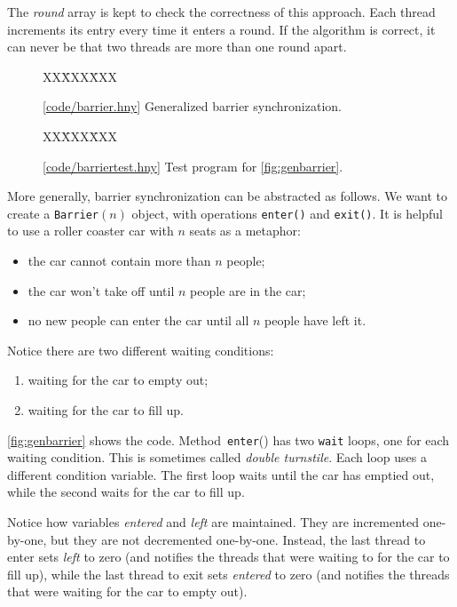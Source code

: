 \documentclass{report}
\newcommand{\harmonysource}[1]{
\begin{tabbing}
XX\=XXX\=XXX\kill
    
\end{tabbing}
}
\newcommand{\harmonylink}[1]{%
[\href{https://harmony.cs.cornell.edu/#1}{\underline{#1}}]%
}
\newenvironment{code}{
\tcolorbox
}{
\endtcolorbox
}
\begin{document}
The \textit{round} array is kept to check the correctness of this
approach.  Each thread increments its entry every time it enters
a round.  If the algorithm is correct, it can never be that two threads
are more than one round apart.

\begin{figure}
\begin{code}
\harmonysource{barrier}
\end{code}
\caption{\harmonylink{code/barrier.hny} Generalized barrier synchronization.}
\label{fig:genbarrier}
\end{figure}

\begin{figure}
\begin{code}
\harmonysource{barriertest}
\end{code}
\caption{\harmonylink{code/barriertest.hny} Test program for \autoref{fig:genbarrier}.}
\label{fig:barriertest}
\end{figure}

More generally, barrier synchronization can be abstracted as follows.
We want to create a \texttt{Barrier}$(n)$ object, with operations
\texttt{enter()} and \texttt{exit()}.  It is helpful to use
a roller coaster car with $n$ seats as a metaphor:
\begin{itemize}
\item the car cannot contain more than $n$ people;
\item the car won't take off until $n$ people are in the car;
\item no new people can enter the car until all $n$ people have left it.
\end{itemize}
Notice there are two different waiting conditions:
\begin{enumerate}
\item waiting for the car to empty out;
\item waiting for the car to fill up.
\end{enumerate}

\autoref{fig:genbarrier} shows the code.
Method~\texttt{enter}() has two \texttt{wait} loops, one for each
waiting condition.
This is sometimes called \emph{double turnstile}.
Each loop uses a different condition variable.
The first loop waits until the car has emptied out, while
the second waits for the car to fill up.

Notice how variables \textit{entered} and \textit{left}
are maintained.  They are incremented one-by-one, but they
are not decremented one-by-one.  Instead, the last thread to
enter sets \textit{left} to zero (and notifies the threads
that were waiting to for the car to fill up), while the last
thread to exit sets \textit{entered} to zero (and notifies
the threads that were waiting for the car to empty out).
\end{document}
